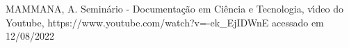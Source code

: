 \documentclass[
12pt,		%
openright,	%
twoside,  %
a4paper,			%
chapter=TITLE,		%
english,			%
french,				%
spanish,			%
brazil				%
]{USPSC-classe/USPSC}
\begin{document}
\begin{flushleft}
\begin{flushleft}
\begin{flushleft}
\begin{flushleft}
\begin{flushleft}
\begin{flushleft}
\begin{flushleft}
\begin{flushleft}
\begin{flushleft}
\begin{flushleft}
\begin{flushleft}
\begin{flushleft}
\begin{flushleft}
\begin{flushleft}
[MAMMANA, 2020] MAMMANA, A. Semin\'ario - Documenta\c{c}\~ao em Ci\^encia e Tecnologia, v\'{\i}deo do Youtube, https://www.youtube.com/watch?v=-ek\_EjIDWnE acessado em 12/08/2022
\end{flushleft}


\end{flushleft}


\end{flushleft}


\end{flushleft}


\end{flushleft}


\end{flushleft}


\end{flushleft}


\end{flushleft}


\end{flushleft}


\end{flushleft}


\end{flushleft}


\end{flushleft}


\end{flushleft}


\end{flushleft}
\end{document}
